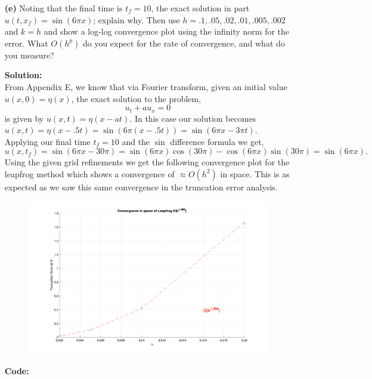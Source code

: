 \documentclass[12pt]{article}
\makeatletter
\theoremstyle{homework}
\newenvironment{exercise}[1]
{\def\@currentlabel{#1}\exercisecore}
{\endexercisecore}
\newcommand{\localhead}[1]{\par\smallskip\noindent\textbf{#1}\nobreak\\}%
\newcommand\solution{\localhead{Solution:}}
\makeatother
\begin{document}
\begin{exercise}{Problem P37}
\begin{enumerate}
      \item[\textbf{(e)}] Noting that the final time is $t_f = 10$, the exact solution in part $u(t, x_f) = \sin(6\pi x)$; explain why. Then use $h = .1, .05, .02, .01, .005, .002$ and $k = h$ and show a log-log convergence plot using the infinity norm for the error. What $O(h^p)$ do you expect for the rate of convergence, and what do you measure?
      

      \solution From Appendix E, we know that via Fourier transform, given an initial value $u(x, 0) = \eta(x)$, the exact solution to the problem, $$u_t + au_x = 0$$ is given by $u(x, t) = \eta(x - at)$. In this case our solution becomes $u(x, t) = \eta(x - .5t) = \sin(6\pi (x - .5t)) = \sin(6\pi x - 3\pi t)$. Applying our final time $t_f = 10$ and the $\sin$ difference formula we get, 
      \begin{equation*}
        u(x, t_f) = \sin(6\pi x - 30\pi) = \sin(6\pi x)\cos(30\pi) - \cos(6\pi x)\sin(30\pi) = \sin(6\pi x).
      \end{equation*} 
      Using the given grid refinements we get the following convergence plot for the leapfrog method which shows a convergence of $\approx O(h^2)$ in space. This is as expected as we saw this same convergence in the truncation error analysis. 

      \begin{figure}[H]
        \begin{center}
          \includegraphics[width=\textwidth]{convergenceleapfrog.png}
        \end{center}
      \end{figure}


      \textbf{Code:}
      \begin{center}
        
      \end{center}
      \vspace*{.15in}


  \end{enumerate}
  
\end{exercise}
\end{document}
